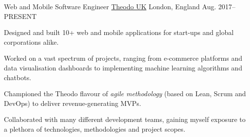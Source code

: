 

\begin{cventries}

  \cventry
    {Web and Mobile Software Engineer} %
    {\href{https://www.theodo.co.uk/}{Theodo UK}} %
    {London, England} %
    {Aug. 2017--\textsc{PRESENT}} %
    {
      \begin{cvitems} %
        \item Designed and built 10+ web and mobile applications for start-ups and global corporations alike.
        \item Worked on a vast spectrum of projects, ranging from e-commerce platforms and data visualisation dashboards to implementing machine learning algorithms and chatbots.
        \item Championed the Theodo flavour of \textit{agile methodology} (based on Lean, Scrum and DevOps) to deliver revenue-generating MVPs.
        \item Collaborated with many different development teams, gaining myself exposure to a plethora of technologies, methodologies and project scopes.
      \end{cvitems}
    }
    {}


\end{cventries}
